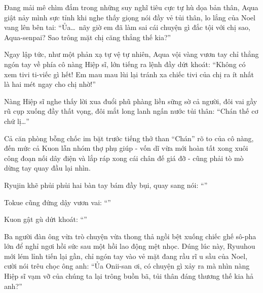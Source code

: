 \documentclass[../main.tex]{subfiles}
\begin{document}
\begin{figure}[H]
  \centering
  \begin{subfigure}[t]{0.45\textwidth}
    \centering
  \end{subfigure}
  \quad
  \begin{subfigure}[t]{0.45\textwidth}
    \centering
  \end{subfigure}
\end{figure}

Đang mải mê chìm đắm trong những suy nghĩ tiêu cực tự hù dọa bản thân, Aqua giật nảy mình sực tỉnh khi nghe thấy giọng nói đầy vẻ tủi thân, lo lắng của Noel vang lên bên tai: ``Ủa\dots\ nãy giờ em đã làm sai cái chuyện gì đắc tội với chị sao, Aqua-senpai? Sao trông mặt chị căng thẳng thế kia?''

Ngay lập tức, như một phản xạ tự vệ tự nhiên, Aqua vội vàng vươn tay chỉ thẳng ngón tay về phía cô nàng Hiệp sĩ, lớn tiếng ra lệnh đầy dứt khoát: ``Không có xem tivi ti-viếc gì hết! Em mau mau lùi lại tránh xa chiếc tivi của chị ra ít nhất là hai mét ngay cho chị nhờ!''

Nàng Hiệp sĩ nghe thấy lời xua đuổi phũ phàng liền sững sờ cả người, đôi vai gầy rũ cụp xuống đầy thất vọng, đôi mắt long lanh ngấn nước tủi thân: ``Chán thế cơ chứ lị\dots''

Cả căn phòng bỗng chốc im bặt trước tiếng thở than ``Chán'' rõ to của cô nàng, đến mức cả Kuon lẫn nhóm thợ phụ giúp - vốn dĩ vừa mới hoàn tất xong xuôi công đoạn nối dây điện và lắp ráp xong cái chân đế giá đỡ - cũng phải tò mò dừng tay quay đầu lại nhìn.

Ryujin khẽ phủi phủi hai bàn tay bám đầy bụi, quay sang nói: ``''

Tokue cũng đứng dậy vươn vai: ``''

Kuon gật gù dứt khoát: ``''

Ba người đàn ông vừa trò chuyện vừa thong thả ngồi bệt xuống chiếc ghế sô-pha lớn để nghỉ ngơi hồi sức sau một hồi lao động mệt nhọc. Đúng lúc này, Ryuuhou mới lém lỉnh tiến lại gần, chỉ ngón tay vào vẻ mặt đang rầu rĩ u sầu của Noel, cười nói trêu chọc ông anh: ``Ủa Onii-san ơi, có chuyện gì xảy ra mà nhìn nàng Hiệp sĩ vạm vỡ của chúng ta lại trông buồn bã, tủi thân đáng thương thế kia hả anh?''
\end{document}
